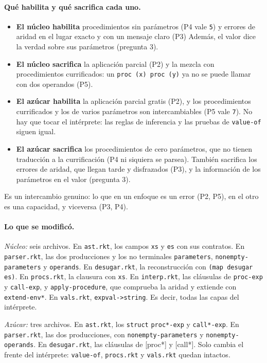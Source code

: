 \documentclass[a4paper, 10pt]{article}
\newcommand{\ttt}[1]{\texttt{#1}}
\begin{document}
\paragraph{Qué habilita y qué sacrifica cada uno.}
\begin{itemize}
  \item \textbf{El núcleo habilita} procedimientos sin parámetros (P4 vale \ttt{5}) y
    errores de aridad en el lugar exacto y con un mensaje claro (P3) Además, el valor
    dice la verdad sobre sus parámetros (pregunta 3).
  \item \textbf{El núcleo sacrifica} la aplicación parcial (P2) y la mezcla con
    procedimientos currificados: un \ttt{proc (x) proc (y)} ya no se puede llamar con dos
    operandos (P5).
  \item \textbf{El azúcar habilita} la aplicación parcial gratis (P2), y los
    procedimientos currificados y los de varios parámetros son intercambiables (P5 vale
    \ttt{7}). No hay que tocar el intérprete: las reglas de inferencia y las pruebas de
    \ttt{value-of} siguen igual.
  \item \textbf{El azúcar sacrifica} los procedimientos de cero parámetros, que no tienen
    traducción a la currificación (P4 ni siquiera se parsea). También sacrifica los
    errores de aridad, que llegan tarde y disfrazados (P3), y la información de los
    parámetros en el valor (pregunta 3).
\end{itemize}
Es un intercambio genuino: lo que en un enfoque es un error (P2, P5), en el otro es una
capacidad, y viceversa (P3, P4).

\paragraph{Lo que se modificó.}
\emph{Núcleo:} seis archivos. En \ttt{ast.rkt}, los campos \ttt{xs} y \ttt{es} con sus
contratos. En \ttt{parser.rkt}, las dos producciones y los no terminales
\ttt{parameters}, \ttt{nonempty-parameters} y \ttt{operands}. En \ttt{desugar.rkt}, la
reconstrucción con \ttt{(map desugar es)}. En \ttt{procs.rkt}, la clausura con
\ttt{xs}. En \ttt{interp.rkt}, las cláusulas de \ttt{proc-exp} y \ttt{call-exp}, y
\ttt{apply-procedure}, que comprueba la aridad y extiende con \ttt{extend-env*}. En
\ttt{vals.rkt}, \ttt{expval->string}. Es decir, todas las capas del intérprete.

\emph{Azúcar:} tres archivos. En \ttt{ast.rkt}, los \ttt{struct} \ttt{proc*-exp} y
\ttt{call*-exp}. En \ttt{parser.rkt}, las dos producciones, con
\ttt{nonempty-parameters} y \ttt{nonempty-operands}. En \ttt{desugar.rkt}, las
cláusulas de [proc*] y [call*]. Solo cambia el frente del intérprete: \ttt{value-of},
\ttt{procs.rkt} y \ttt{vals.rkt} quedan intactos.
\end{document}
